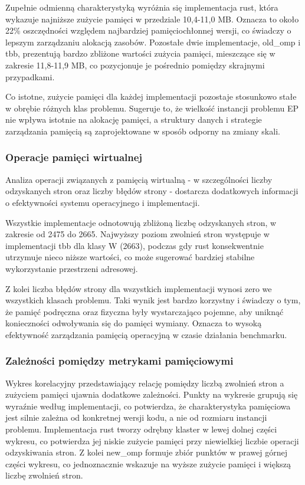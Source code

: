 Zupełnie odmienną charakterystyką wyróżnia się implementacja rust, która wykazuje najniższe zużycie pamięci w przedziale 10,4-11,0 MB. Oznacza to około 22\% oszczędności względem najbardziej pamięciochłonnej wersji, co świadczy o lepszym zarządzaniu alokacją zasobów. Pozostałe dwie implementacje, old\_omp i tbb, prezentują bardzo zbliżone wartości zużycia pamięci, mieszczące się w zakresie 11,8-11,9 MB, co pozycjonuje je pośrednio pomiędzy skrajnymi przypadkami.

Co istotne, zużycie pamięci dla każdej implementacji pozostaje stosunkowo stałe w obrębie różnych klas problemu. Sugeruje to, że wielkość instancji problemu EP nie wpływa istotnie na alokację pamięci, a struktury danych i strategie zarządzania pamięcią są zaprojektowane w sposób odporny na zmiany skali.

\subsubsection{Operacje pamięci wirtualnej}
Analiza operacji związanych z pamięcią wirtualną - w szczególności liczby odzyskanych stron oraz liczby błędów strony - dostarcza dodatkowych informacji o efektywności systemu operacyjnego i implementacji.

Wszystkie implementacje odnotowują zbliżoną liczbę odzyskanych stron, w zakresie od 2475 do 2665. Najwyższy poziom zwolnień stron występuje w implementacji tbb dla klasy W (2663), podczas gdy rust konsekwentnie utrzymuje nieco niższe wartości, co może sugerować bardziej stabilne wykorzystanie przestrzeni adresowej.

Z kolei liczba błędów strony dla wszystkich implementacji wynosi zero we wszystkich klasach problemu. Taki wynik jest bardzo korzystny i świadczy o tym, że pamięć podręczna oraz fizyczna były wystarczająco pojemne, aby uniknąć konieczności odwoływania się do pamięci wymiany. Oznacza to wysoką efektywność zarządzania pamięcią operacyjną w czasie działania benchmarku.

\subsubsection{Zależności pomiędzy metrykami pamięciowymi}
Wykres korelacyjny przedstawiający relację pomiędzy liczbą zwolnień stron a zużyciem pamięci ujawnia dodatkowe zależności. Punkty na wykresie grupują się wyraźnie według implementacji, co potwierdza, że charakterystyka pamięciowa jest silnie zależna od konkretnej wersji kodu, a nie od rozmiaru instancji problemu. Implementacja rust tworzy odrębny klaster w lewej dolnej części wykresu, co potwierdza jej niskie zużycie pamięci przy niewielkiej liczbie operacji odzyskiwania stron. Z kolei new\_omp formuje zbiór punktów w prawej górnej części wykresu, co jednoznacznie wskazuje na wyższe zużycie pamięci i większą liczbę zwolnień stron.

